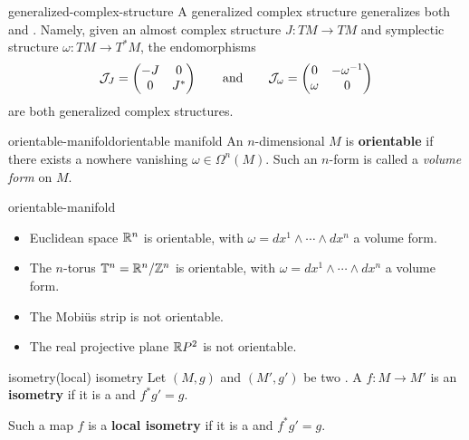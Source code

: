 \begin{example}{generalized-complex-structure}
    A generalized complex structure generalizes both  and . Namely, given an almost complex structure $J \colon TM \to TM$ and symplectic structure $\omega \colon TM \to T^*M$, the endomorphisms
    \[ \mathcal{J}_J = \begin{pmatrix} -J & 0 \\ 0 & J^* \end{pmatrix} \qquad \textup{and} \qquad \mathcal{J}_\omega = \begin{pmatrix} 0 & -\omega^{-1} \\ \omega & 0 \end{pmatrix} \]
    are both generalized complex structures.
\end{example}

\begin{topic}{orientable-manifold}{orientable manifold}
    An $n$-dimensional  $M$ is \textbf{orientable} if there exists a nowhere vanishing  $\omega \in \Omega^n(M)$. Such an $n$-form is called a \textit{volume form} on $M$.
\end{topic}

\begin{example}{orientable-manifold}
    \begin{itemize}
        \item Euclidean space $\mathbb{R}^n$ is orientable, with $\omega = dx^1 \wedge \cdots \wedge dx^n$ a volume form.
        \item The $n$-torus $\mathbb{T}^n = \mathbb{R}^n / \mathbb{Z}^n$ is orientable, with $\omega = dx^1 \wedge \cdots \wedge dx^n$ a volume form.
        \item The Mobiüs strip is not orientable.
        \item The real projective plane $\mathbb{R} P^2$ is not orientable.
    \end{itemize}
\end{example}

\begin{topic}{isometry}{(local) isometry}
    Let $(M, g)$ and $(M', g')$ be two . A  $f \colon M \to M'$ is an \textbf{isometry} if it is a  and $f^*g' = g$.
    
    Such a map $f$ is a \textbf{local isometry} if it is a  and $f^*g' = g$.
\end{topic}

